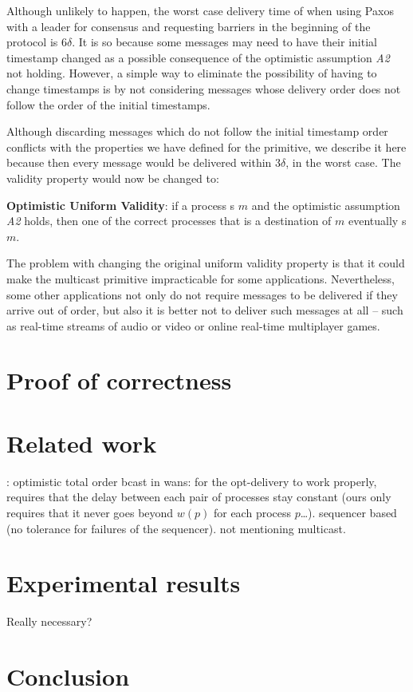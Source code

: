 \documentclass[times, 10pt]{article}
\begin{document}
Although unlikely to happen, the worst case delivery time of \cms{} when using Paxos with a leader for consensus and requesting barriers in the beginning of the protocol is $6\delta$. It is so because some messages may need to have their initial timestamp changed as a possible consequence of the optimistic assumption \emph{A2} not holding. However, a simple way to eliminate the possibility of having to change timestamps is by not considering messages whose delivery order does not follow the order of the initial timestamps.

Although discarding messages which do not follow the initial timestamp order conflicts with the properties we have defined for the \cms{} primitive, we describe it here because then every message would be delivered within $3\delta$, in the worst case. The validity property would now be changed to:

\textbf{Optimistic Uniform Validity}: if a process \cms{}s $m$ and the optimistic assumption \emph{A2} holds, then one of the correct processes that is a destination of $m$ eventually \cons{}s $m$.

The problem with changing the original uniform validity property is that it could make the multicast primitive impracticable for some applications. Nevertheless, some other applications not only do not require messages to be delivered if they arrive out of order, but also it is better not to deliver such messages at all -- such as real-time streams of audio or video or online real-time multiplayer games.


\section{Proof of correctness}

\section{Related work}

\cite{sousa2002oto}: optimistic total order bcast in wans: for the opt-delivery to work properly, requires that the delay between each pair of processes stay constant (ours only requires that it never goes beyond $w(p)$ for each process $p$\ldots). sequencer based (no tolerance for failures of the sequencer). not mentioning multicast.

\section{Experimental results}

Really necessary?

\section{Conclusion}

%
%


\end{document}
